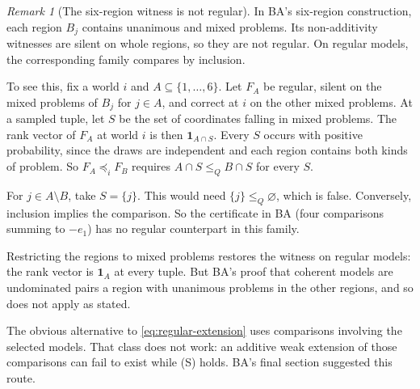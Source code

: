 \documentclass[11pt]{article}
\theoremstyle{remark}\newtheorem{remark}[theorem]{Remark}
\newcommand{\one}{\mathbf 1}
\begin{document}
\begin{remark}[The six-region witness is not regular]\label{rem:collapse}
In BA's six-region construction, each region $B_j$ contains unanimous and
mixed problems. Its non-additivity witnesses are silent on whole regions, so
they are not regular. On regular models, the corresponding family compares by
inclusion.

To see this, fix a world $i$ and $A\subseteq\{1,\ldots,6\}$. Let $F_A$ be regular,
silent on the mixed problems of $B_j$ for $j\in A$, and correct at $i$ on the
other mixed problems. At a sampled tuple, let $S$ be the set of coordinates
falling in mixed problems. The rank vector of $F_A$ at world $i$ is then
$\one_{A\cap S}$. Every $S$ occurs with positive probability, since the
draws are independent and each region contains both kinds of problem. So
$F_A\preceq_iF_B$ requires $A\cap S\le_QB\cap S$ for every $S$.

For $j\in A\setminus B$, take $S=\{j\}$. This would need $\{j\}\le_Q\varnothing$,
which is false. Conversely, inclusion implies the comparison. So the
certificate in BA (four comparisons summing to $-e_1$) has no regular
counterpart in this family.

Restricting the regions to mixed problems restores the witness on regular
models: the rank vector is $\one_A$ at every tuple. But BA's proof that
coherent models are undominated pairs a region with unanimous problems in
the other regions, and so does not apply as stated.
\end{remark}

The obvious alternative to \eqref{eq:regular-extension} uses comparisons
involving the selected models. That class does not work: an additive weak
extension of those comparisons can fail to exist while (S) holds. BA's final
section suggested this route.
\end{document}
